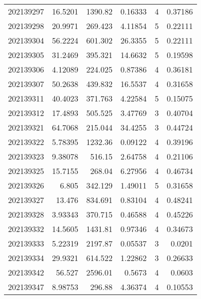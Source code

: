 \begin{tabular}{rrrrrr}
 202139297 &         16.5201  &     1390.82   &            0.16333 &           4 & 0.37186 \\
 202139298 &         20.9971  &      269.423  &            4.11854 &           5 & 0.22111 \\
 202139304 &         56.2224  &      601.302  &           26.3355  &           5 & 0.22111 \\
 202139305 &         31.2469  &      395.321  &           14.6632  &           5 & 0.19598 \\
 202139306 &          4.12089 &      224.025  &            0.87386 &           4 & 0.36181 \\
 202139307 &         50.2638  &      439.832  &           16.5537  &           4 & 0.31658 \\
 202139311 &         40.4023  &      371.763  &            4.22584 &           5 & 0.15075 \\
 202139312 &         17.4893  &      505.525  &            3.47769 &           3 & 0.40704 \\
 202139321 &         64.7068  &      215.044  &           34.4255  &           3 & 0.44724 \\
 202139322 &          5.78395 &     1232.36   &            0.09122 &           4 & 0.39196 \\
 202139323 &          9.38078 &      516.15   &            2.64758 &           4 & 0.21106 \\
 202139325 &         15.7155  &      268.04   &            6.27956 &           4 & 0.46734 \\
 202139326 &          6.805   &      342.129  &            1.49011 &           5 & 0.31658 \\
 202139327 &         13.476   &      834.691  &            0.83104 &           4 & 0.48241 \\
 202139328 &          3.93343 &      370.715  &            0.46588 &           4 & 0.45226 \\
 202139332 &         14.5605  &     1431.81   &            0.97346 &           4 & 0.34673 \\
 202139333 &          5.22319 &     2197.87   &            0.05537 &           3 & 0.0201  \\
 202139334 &         29.9321  &      614.522  &            1.22862 &           3 & 0.26633 \\
 202139342 &         56.527   &     2596.01   &            0.5673  &           4 & 0.0603  \\
 202139347 &          8.98753 &      296.88   &            4.36374 &           4 & 0.10553 \\

\end{tabular}
